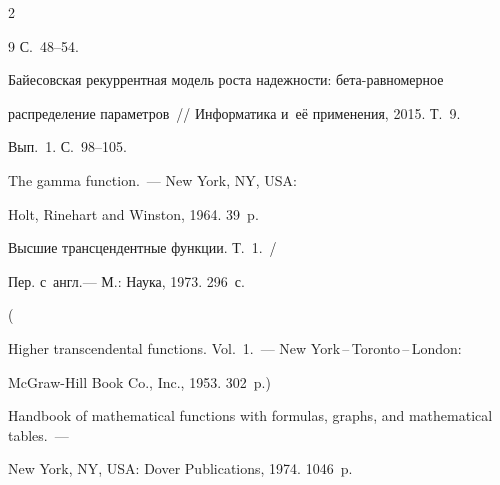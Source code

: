 \begin{multicols}{2}
{{\begin{thebibliography}{9}
С.~48--54.









Байесовская рекуррентная модель роста надежности: бета-рав\-но\-мер\-ное


распределение параметров~// Информатика и~её применения, 2015. Т.~9.


Вып.~1. С.~98--105.







 The gamma function.~--- New York, NY, USA: 


Holt, Rinehart and Winston, 1964. 39~p.







 Высшие трансцендентные функции. Т.~1.~/


Пер. с~англ.---  М.: Наука, 1973. 296~с.


(  


{Higher transcendental functions}. Vol.~1.~--- New York\,--\,Toronto\,--\,London: 


McGraw-Hill Book Co., Inc., 1953. 302~p.)









Handbook of mathematical functions with formulas, graphs, and mathematical tables.~--- 


New York, NY, USA: Dover Publications, 1974. 1046~p.


 \end{thebibliography}





 }


 }





\end{multicols}





\vspace*{-6pt}





